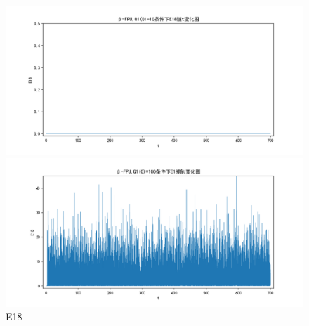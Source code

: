 \documentclass[10pt, a4paper]{article}
\begin{document}
    \begin{figure}[H]
        \begin{minipage}[t]{0.49\textwidth}
            \centering
            \includegraphics[width=\textwidth]{./q6_pics/cmp/E18.png}
        \end{minipage}
        \begin{minipage}[t]{0.49\textwidth}
            \centering
            \includegraphics[width=\textwidth]{./q6_pics/exp/E18.png}
        \end{minipage}
        \caption{E18}\label{fig:E18 in q6}
    \end{figure}
\end{document}
